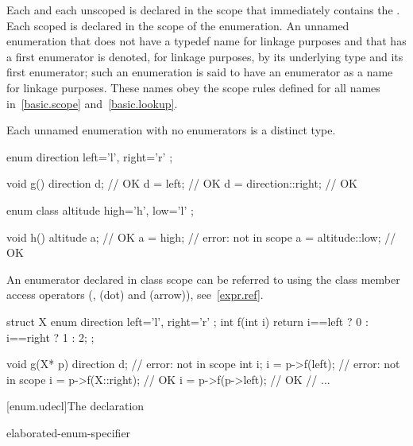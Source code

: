 \pnum
{}%
Each  and each unscoped  is
declared in the scope that immediately contains the .
Each scoped  is declared in the scope of the
enumeration.
An unnamed enumeration
that does not have a typedef name for linkage purposes and
that has a first enumerator
is denoted, for linkage purposes,
by its underlying type and its first enumerator;
such an enumeration is said to have
an enumerator as a name for linkage purposes.
These names obey the scope rules defined for all names
in~\ref{basic.scope} and~\ref{basic.lookup}.
\begin{note}
Each unnamed enumeration with no enumerators is a distinct type.
\end{note}
\begin{example}
\begin{codeblock}
enum direction { left='l', right='r' };

void g()  {
  direction d;                  // OK
  d = left;                     // OK
  d = direction::right;         // OK
}

enum class altitude { high='h', low='l' };

void h()  {
  altitude a;                   // OK
  a = high;                     // error:  not in scope
  a = altitude::low;            // OK
}
\end{codeblock}
\end{example}
%
An enumerator declared in class scope can be referred to using the class
member access operators (\tcode{::},  (dot) and \tcode{->}
(arrow)), see~\ref{expr.ref}.
\begin{example}
\begin{codeblock}
struct X {
  enum direction { left='l', right='r' };
  int f(int i) { return i==left ? 0 : i==right ? 1 : 2; }
};

void g(X* p) {
  direction d;                  // error:  not in scope
  int i;
  i = p->f(left);               // error:  not in scope
  i = p->f(X::right);           // OK
  i = p->f(p->left);            // OK
  // ...
}
\end{codeblock}
\end{example}

[enum.udecl]{The  declaration}%
%

\begin{bnf}
\br
     elaborated-enum-specifier \terminal{;}
\end{bnf}

